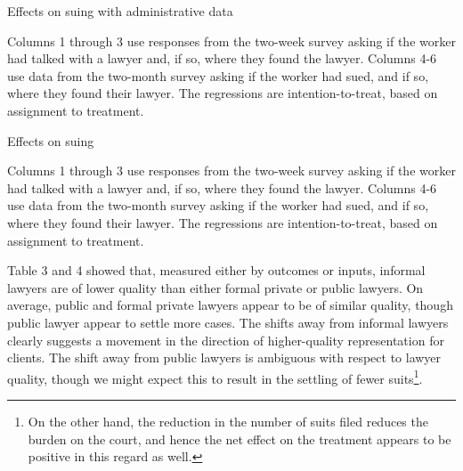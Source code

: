 \documentclass[oneside,12pt]{article}
\begin{document}
\begin{table}[!ht]
    \caption{Effects on suing with administrative data} 
    \label{tab:9_lawyer_uncond}
    \center
    \scriptsize{}
    \begin{figurenotes}
    Columns 1 through 3 use responses from the two-week survey asking if the worker had talked with a lawyer and, if so, where they found the lawyer. Columns 4-6 use data from the two-month survey asking if the worker had sued, and if so, where they found their lawyer. The regressions are intention-to-treat, based on assignment to treatment.
    \end{figurenotes}
  
\end{table}


\begin{table}[!ht]
    \caption{Effects on suing} 
    \label{tab:9_lawyer_uncond}
    \center
    \scriptsize{}
    \begin{figurenotes}
    Columns 1 through 3 use responses from the two-week survey asking if the worker had talked with a lawyer and, if so, where they found the lawyer. Columns 4-6 use data from the two-month survey asking if the worker had sued, and if so, where they found their lawyer. The regressions are intention-to-treat, based on assignment to treatment.
    \end{figurenotes}
  
\end{table}

Table 3 and 4 showed that, measured either by outcomes or inputs, informal lawyers are of lower quality than either formal private or public lawyers. On average, public and formal private lawyers appear to be of similar quality, though public lawyer appear to settle more cases. The shifts away from informal lawyers clearly suggests a movement in the direction of higher-quality representation for clients. The shift away from public lawyers is ambiguous with respect to lawyer quality, though we might expect this to result in the settling of fewer suits\footnote{ On the other hand, the reduction in the number of suits filed reduces the burden on the court, and hence the net effect on the treatment appears to be positive in this regard as well. }.  
\end{document}
